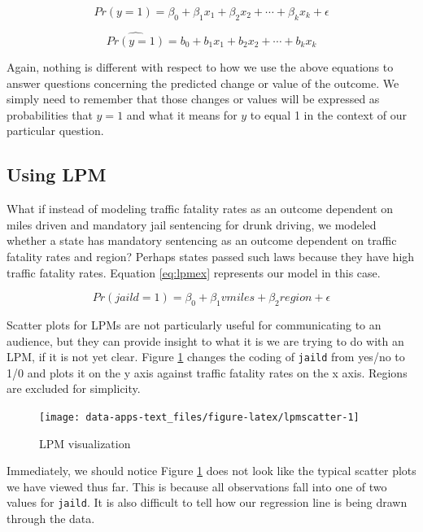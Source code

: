 \documentclass[
]{book}
\begin{document}
\begin{equation}
Pr(y=1)=\beta_0+\beta_1x_1+\beta_2x_2+\cdots+\beta_kx_k+\epsilon
\label{eq:lpm}
\end{equation}

\begin{equation}
\hat{Pr(y=1)}=b_0+b_1x_1+b_2x_2+\cdots +b_kx_k
\label{eq:lpmsample}
\end{equation}

Again, nothing is different with respect to how we use the above equations to answer questions concerning the predicted change or value of the outcome. We simply need to remember that those changes or values will be expressed as probabilities that \(y=1\) and what it means for \(y\) to equal 1 in the context of our particular question.

\hypertarget{using-lpm}{%
\subsection{Using LPM}\label{using-lpm}}

What if instead of modeling traffic fatality rates as an outcome dependent on miles driven and mandatory jail sentencing for drunk driving, we modeled whether a state has mandatory sentencing as an outcome dependent on traffic fatality rates and region? Perhaps states passed such laws because they have high traffic fatality rates. Equation \eqref{eq:lpmex} represents our model in this case.

\begin{equation}
Pr(jaild=1)=\beta_0+\beta_1vmiles+\beta_2region+\epsilon
\label{eq:lpmex}
\end{equation}

Scatter plots for LPMs are not particularly useful for communicating to an audience, but they can provide insight to what it is we are trying to do with an LPM, if it is not yet clear. Figure \ref{fig:lpmscatter} changes the coding of \texttt{jaild} from yes/no to 1/0 and plots it on the y axis against traffic fatality rates on the x axis. Regions are excluded for simplicity.

\begin{figure}

{\centering \texttt{[image: data-apps-text\_files/figure-latex/lpmscatter-1]} 

}

\caption{LPM visualization}\label{fig:lpmscatter}
\end{figure}

Immediately, we should notice Figure \ref{fig:lpmscatter} does not look like the typical scatter plots we have viewed thus far. This is because all observations fall into one of two values for \texttt{jaild}. It is also difficult to tell how our regression line is being drawn through the data.
\end{document}
